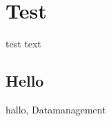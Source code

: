 \documentclass[11pt]{scrartcl}
\begin{document}
    
    \tableofcontents
    \newpage
    \section{Test}
    test text
    \subsection{Hello}
    hallo, Datamanagement
        
        
                




\end{document}
